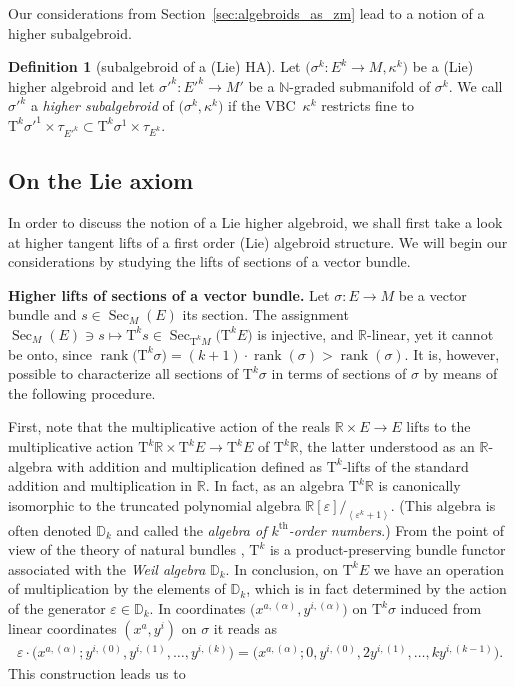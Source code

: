 \documentclass[10pt,a4paper]{amsart}
\newcommand{\ZM}{{VBC}} %
\newcommand{\thh}[1]{#1^{\mathrm{th}}} %
\newcommand{\R}{\mathbb{R}}
\newcommand{\N}{\mathbb{N}}
\newcommand{\D}{\mathbb{D}}
\newcommand{\Sec}{\operatorname{Sec}}
\newcommand{\rank}{\operatorname{rank}}
\newcommand{\ra}{\rightarrow}
\newcommand{\eps}{\varepsilon}
\newcommand{\TT}[1]{\mathrm{T}^{#1}} %
\def\<#1>{\left\langle #1\right\rangle}
\numberwithin{equation}{section}
\theoremstyle{definition}
\newtheorem{df}[thm]{Definition}
\begin{document}
 Our considerations from Section~\ref{sec:algebroids_as_zm} lead to a notion of a higher subalgebroid.
\begin{df}[subalgebroid of a (Lie) HA]\label{def:higher_sub_algebroid} Let $\big(\sigma^k\colon E^k\ra M, \kappa^k\big)$ be a (Lie) higher algebroid and let ${\sigma'}^{k}\colon {E'}^{k}\ra M'$ be a $\N$-graded submanifold of $\sigma^k$. We call ${\sigma'}^{k}$ a \emph{higher subalgebroid} of $\big(\sigma^k,\kappa^k\big)$ if the \ZM\ $\kappa^k$ restricts fine to $\TT{k}{\sigma'}^1\times\tau_{{E'}^k}\subset\TT{k}\sigma^1\times\tau_{E^k}$.
\end{df}

\subsection{On the Lie axiom}\label{ssec:higher_lie}

In order to discuss the notion of a Lie higher algebroid, we shall first take a look at higher tangent lifts of a first order (Lie) algebroid structure. We will begin our considerations by studying the lifts of sections of a vector bundle.

{\bf Higher lifts of sections of a vector bundle.} Let $\sigma\colon E\ra M$ be a vector bundle and $s\in\Sec_M(E)$ its section. The assignment $\Sec_M(E)\ni s\mapsto \TT{k} s\in\Sec_{\TT{k} M}\big(\TT{k} E\big)$ is injective, and $\R$-linear, yet it cannot be onto, since $\rank\big(\TT{k}\sigma\big)=(k+1)\cdot\rank(\sigma) > \rank(\sigma)$. It is, however, possible to characterize all sections of $\TT{k}\sigma$ in terms of sections of $\sigma$ by means of the following procedure.

First{,} note that the multiplicative action of the reals $\R\times E\ra E$ lifts to the multiplicative action $\TT{k}\R\times\TT{k} E\ra\TT{k} E$ of $\TT{k}\R$, the latter understood as an $\R$-algebra with addition and multiplication defined as $\TT{k}$-lifts of the standard addition and multiplication in $\R$. In fact, as an algebra $\TT{k}\R$ is canonically isomorphic to the truncated polynomial algebra $\R[\eps]/_{\<\eps^{k+1}>}$. (This algebra is often denoted $\D_k$ and called the \emph{algebra of $\thh{k}$-order numbers}.) From the point of view of the theory of natural bundles \cite{KMS_1993}, $\TT{k}$ is a product-preserving bundle functor associated with the \emph{Weil algebra} $\D_k$. In conclusion, on $\TT{k} E$ we have an operation of multiplication by the elements of $\D_k$, which is in fact determined by the action of the generator $\eps\in\D_k$. In coordinates $\big(x^{a,(\alpha)},y^{i,(\alpha)}\big)$ on $\TT{k}\sigma$ induced from linear coordinates $(x^a,y^i)$ on $\sigma$ it reads as
\begin{gather*}\eps\cdot \big(x^{a,(\alpha)};y^{i,(0)},y^{i,(1)},\hdots,y^{i,(k)}\big)=
\big(x^{a,(\alpha)};0, y^{i,(0)}, 2 y^{i, (1)}, \hdots,k y^{i,(k-1)}\big).\end{gather*}
This construction leads us to
\end{document}
